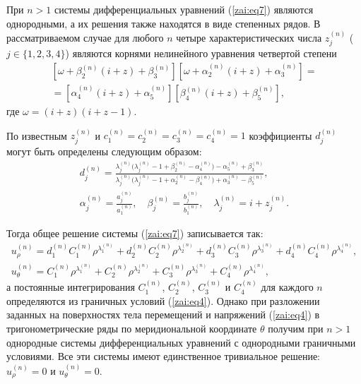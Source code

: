 При $n > 1$ системы дифференциальных уравнений (\ref{zai:eq7}) являются
однородными, а их решения также находятся в виде степенных рядов. В
рассматриваемом случае для любого $n$ четыре характеристических
числа $z_j^{( n)} $ ($j {\in} \{ 1,  2,  3, 4\}$)
являются корнями нелинейного уравнения четвертой степени
\begin{multline*}
 \left[ {\omega + \beta _2^{(n)} \left( {i + z} \right) + \beta
_3^{(n)} } \right]\left[ {\omega + \alpha _2^{\left( n
\right)}
\left( {i + z} \right) + \alpha _3^{(n)} } \right] = \\
 = \left[ {\alpha _4^{(n)} \left( {i + z} \right) + \alpha
_5^{(n)} } \right]\left[ {\beta _4^{(n)}
\left( {i + z} \right) + \beta _5^{(n)} } \right],
\end{multline*}
\noindent где
$
\omega = \left( {i + z} \right)\left( {i + z - 1} \right).
$

По известным $z_j^{(n)} $ и $ c_1^{(n)} =
c_2^{(n)} = c_3^{(n)} = c_4^{\left( n
\right)} = 1 $  коэффициенты $d_j^{(n)}$  могут быть
определены следующим образом:
\begin{gather*}
d_j^{(n)} = \frac
{\lambda _j^{(n)} \bigl(\lambda _j^{(n)} - 1 + \beta _2^{(n)} -\alpha _4^{(n)}  \bigr) - \alpha _5^{(n)} + \beta _3^{(n)} }
{\lambda _j^{(n)} \bigl(\lambda _j^{(n)} - 1 + \alpha _2^{(n)} - \beta _4^{(n)} \bigr) + \alpha _3^{(n)} - \beta _5^{(n)} },
\\
\alpha _j^{(n)} =
\frac{a_j^{(n)} }{a_1^{(n)} }, \quad \beta _j^{(n)} = \frac{b_j^{(n)} }{b_1^{(n)} }, \quad \lambda _j^{(n)} = i + z_j^{(n)}.
\end{gather*}

Тогда общее решение системы (\ref{zai:eq7}) записывается так:
\begin{gather*}
u^{(n)}_{\rho} = d^{(n)}_{1}
C^{(n)}_{1} \rho ^{\lambda^{(n)}_{1} } +
d^{(n)}_{2} C^{(n)}_{2} \rho
^{\lambda^{(n)}_{2} } + d^{(n)}_{3}
C^{(n)}_{3} \rho ^{\lambda^{(n)}_{3} } +
d^{(n)}_{4} C^{(n)}_{4} \rho
^{\lambda^{(n)}_{4} },
\\
u^{(n)}_{\theta} = C^{(n)}_{1} \rho
^{\lambda^{(n)}_{1} } + C^{(n)}_{2} \rho
^{\lambda^{(n)}_{2} } + C^{(n)}_{3} \rho
^{\lambda^{(n)}_{3} } + C^{(n)}_{4} \rho
^{\lambda^{(n)}_{4} },
\end{gather*}
\noindent а постоянные интегрирования $C^{(n)}_{1} $,
$C^{(n)}_{2} $, $C^{(n)}_{3} $ и
$C^{(n)}_{4} $ для каждого $n$ определяются из
граничных условий (\ref{zai:eq4}). Однако при разложении заданных на
поверхностях тела перемещений и напряжений (\ref{zai:eq4}) в
тригонометрические ряды по меридиональной координате $\theta $
получим при $n > 1$ однородные системы дифференциальных уравнений с
однородными граничными условиями. Все эти системы имеют единственное
тривиальное решение: $u^{(n)}_{\rho} = 0$ и $u^{\left(
n \right)}_{\theta} = 0$.

